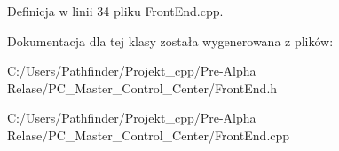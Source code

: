 Definicja w linii 34 pliku Front\+End.\+cpp.



Dokumentacja dla tej klasy została wygenerowana z plików\+:\begin{DoxyCompactItemize}
\item 
C\+:/\+Users/\+Pathfinder/\+Projekt\+\_\+cpp/\+Pre-\/\+Alpha Relase/\+P\+C\+\_\+\+Master\+\_\+\+Control\+\_\+\+Center/Front\+End.\+h\item 
C\+:/\+Users/\+Pathfinder/\+Projekt\+\_\+cpp/\+Pre-\/\+Alpha Relase/\+P\+C\+\_\+\+Master\+\_\+\+Control\+\_\+\+Center/Front\+End.\+cpp\end{DoxyCompactItemize}
